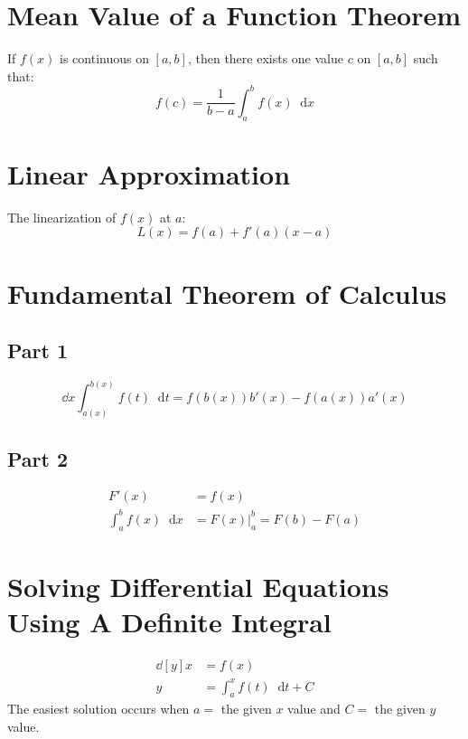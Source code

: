 \documentclass[12pt]{article}
\newcommand*{\D}[1]{\mathop{}\!\mathrm{d}#1}
\newcommand*{\fixmath}{%
  \makebox{}\vspace{\glueexpr-\baselineskip-\abovedisplayskip}}
\newenvironment{fixaskip}{\setlength{\abovedisplayskip}{0pt}\fixmath%
  \ignorespaces}{\ignorespacesafterend}
\newenvironment{fixbskip}{\setlength{\belowdisplayskip}{0pt}\ignorespaces}%
  {\ignorespacesafterend}
\newenvironment{fixskip}{\setlength{\abovedisplayskip}{0pt}%
  \setlength{\belowdisplayskip}{0pt}\fixmath\ignorespaces}%
  {\ignorespacesafterend}
\begin{document}
\section*{Mean Value of a Function Theorem}
If \(f(x)\) is continuous on \([a,b]\), then there exists one value \(c\) on
\([a,b]\) such that:
\begin{fixbskip}
  \[
    f(c) = \frac{1}{b - a} \int_a^b f(x) \D{x}
  \]
\end{fixbskip}
\section*{Linear Approximation}
The linearization of \(f(x)\) at \(a\):
\begin{fixbskip}
  \[
    L(x) = f(a) + f'(a)(x-a)
  \]
\end{fixbskip}
\section*{Fundamental Theorem of Calculus}
\subsection*{Part 1}
\begin{fixskip}
  \[
    \dd{x} \int_{a(x)}^{b(x)} f(t) \D{t} = f(b(x)) b'(x) - f(a(x)) a'(x)
  \]
\end{fixskip}
\subsection*{Part 2}
\begin{fixskip}
  \begin{align*}
    F'(x) &= f(x)\\
    \int_a^b f(x) \D{x} &= F(x) \bigg|_a^b = F(b) - F(a)
  \end{align*}
\end{fixskip}
\section*{Solving Differential Equations Using A Definite Integral}
\begin{fixaskip}
  \begin{align*}
    \dd[y]{x} &= f(x)\\
    y &= \int_a^x f(t) \D{t} + C
  \end{align*}
\end{fixaskip}
The easiest solution occurs when \(a = \) the given \(x\) value and \(C = \)
the given \(y\) value.
\end{document}
